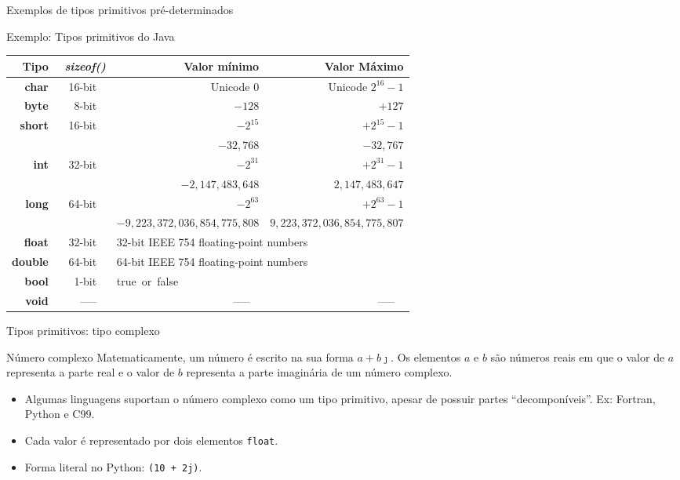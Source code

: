 \documentclass[handout]{beamer}
\begin{document}
\begin{frame}[fragile]{Exemplos de tipos primitivos pré-determinados}
\begin{block}{Exemplo: Tipos primitivos do Java}
\scriptsize
\centering
    \begin{tabular}{rrrr}
    \hline
    \textbf{Tipo} & \textbf{\textit{sizeof()}} & \textbf{Valor mínimo} & \textbf{Valor Máximo} \\
    \hline
    \textbf{char} &   16-bit   &   Unicode $0$ &   Unicode $2^{16}-1$ \\
    \textbf{byte} &   8-bit   &   $-128$ &   $+127$ \\[1mm]
    \multirow{2}[2]{*}{\textbf{short}} & \multirow{2}[2]{*}{  16-bit  } &   $-2^{15}$ &   $+2^{15}-1$ \\[1mm]
																			 &      						 							& $-32,768$ &   $-32,767$ \\[1mm]
    \multirow{2}[2]{*}{\textbf{int}} & \multirow{2}[2]{*}{  32-bit  } 	&   $-2^{31}$ &   $+2^{31}-1$ \\[1mm]
																			 &					 							& \tiny $-2,147,483,648$ & \tiny $2,147,483,647$ \\[1mm]
    \multirow{2}[2]{*}{\textbf{long}} & \multirow{2}[2]{*}{  64-bit  } &   $-2^{63}$ &   $+2^{63}-1$ \\[1mm]
          &       & \tiny $-9,223,372,036,854,775,808$ & \tiny $9,223,372,036,854,775,807$ \\[1mm]
    \textbf{float} &   32-bit   & \multicolumn{2}{l}{32-bit IEEE 754 floating-point numbers}  \\[1mm]
    \textbf{double} &   64-bit   & \multicolumn{2}{l}{64-bit IEEE 754 floating-point numbers} \\[1mm]
    \textbf{bool} &   1-bit   & \multicolumn{2}{l}{true or false} \\[1mm]
    \textbf{void} &   -----   &   -----   &   -----   \\
    \hline
    \end{tabular}%
\end{block}
\end{frame}


\begin{frame}[fragile]{Tipos primitivos: tipo complexo}

\begin{block}{Número complexo}
    Matematicamente, um número é escrito na sua forma $a + b\jmath$. Os elementos $a$ e $b$ são números reais em que o valor de $a$ representa a parte real e o valor de $b$ representa a parte imaginária de um número complexo.
\end{block}

\begin{itemize}
    \item Algumas linguagens suportam o número complexo como um tipo primitivo, apesar de possuir partes ``decomponíveis''. Ex: Fortran, Python e C99.
    \item Cada valor é representado por dois elementos \lstinline|float|.
    \item Forma literal no Python: \lstinline|(10 + 2j)|.
\end{itemize}

\end{frame}
\end{document}
